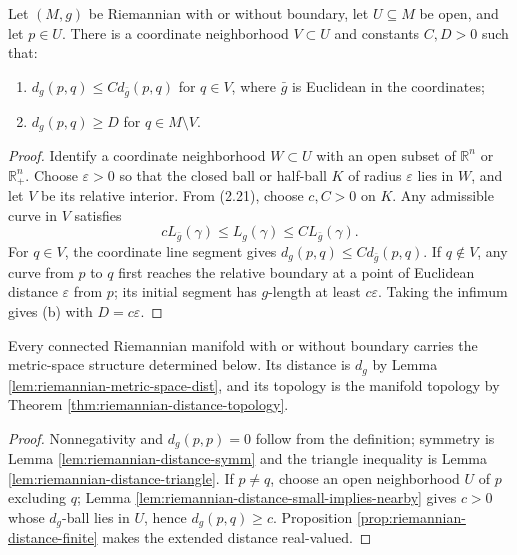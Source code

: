 \begin{lemma}\label{lem:distance-comparison-neighborhood}
\leanok
{}
Let $(M,g)$ be Riemannian with or without boundary, let $U\subseteq M$ be open, and let $p\in U$. There is a coordinate neighborhood $V\subset U$ and constants $C,D>0$ such that:
\begin{enumerate}
\item[(a)] $d_g(p,q)\le C d_{\bar g}(p,q)$ for $q\in V$, where $\bar g$ is Euclidean in the coordinates;
\item[(b)] $d_g(p,q)\ge D$ for $q\in M\setminus V$.
\end{enumerate}
\begin{proof}
\leanok
\sketch Identify a coordinate neighborhood $W\subset U$ with an open subset of $\mathbb R^n$ or $\mathbb R^n_+$. Choose $\varepsilon>0$ so that the closed ball or half-ball $K$ of radius $\varepsilon$ lies in $W$, and let $V$ be its relative interior. From (2.21), choose $c,C>0$ on $K$. Any admissible curve in $V$ satisfies
\[
cL_{\bar g}(\gamma)\le L_g(\gamma)\le CL_{\bar g}(\gamma).\tag{2.22}
\]
For $q\in V$, the coordinate line segment gives $d_g(p,q)\le C d_{\bar g}(p,q)$. If $q\notin V$, any curve from $p$ to $q$ first reaches the relative boundary at a point of Euclidean distance $\varepsilon$ from $p$; its initial segment has $g$-length at least $c\varepsilon$. Taking the infimum gives (b) with $D=c\varepsilon$.
\end{proof}
\end{lemma}

\begin{theorem}
\label{thm:riemannian-manifolds-metric-spaces}
\leanok
{}
Every connected Riemannian manifold with or without boundary carries the metric-space structure determined below. Its distance is $d_g$ by Lemma \ref{lem:riemannian-metric-space-dist}, and its topology is the manifold topology by Theorem \ref{thm:riemannian-distance-topology}.
\end{theorem}
\begin{proof}
\leanok
{}
\sketch Nonnegativity and $d_g(p,p)=0$ follow from the definition; symmetry is Lemma \ref{lem:riemannian-distance-symm} and the triangle inequality is Lemma \ref{lem:riemannian-distance-triangle}. If $p\ne q$, choose an open neighborhood $U$ of $p$ excluding $q$; Lemma \ref{lem:riemannian-distance-small-implies-nearby} gives $c>0$ whose $d_g$-ball lies in $U$, hence $d_g(p,q)\ge c$. Proposition \ref{prop:riemannian-distance-finite} makes the extended distance real-valued.
\end{proof}

